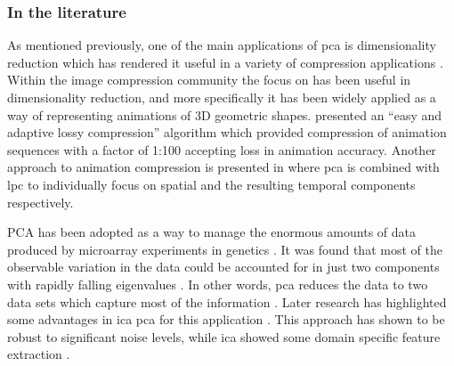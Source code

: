 \subsubsection{In the literature}
As mentioned previously, one of the main applications of \DIFdelbegin {}\DIFdelend \DIFaddbegin \gls{pca} \DIFaddend is dimensionality reduction which has rendered it useful in a variety of compression applications \citep{Vasilescu2003}\cite{Alexa2000}\linebreak[2]\cite{Zaeri2006}. Within the image compression community \citep{Vasilescu2003} the focus on \DIFdelbegin {}\DIFdelend \DIFaddbegin {}\DIFaddend has been useful in dimensionality reduction, and more specifically it has been widely applied as a way of representing animations of 3D geometric shapes. \cite{Alexa2000} presented an ``easy and adaptive lossy compression'' algorithm which provided compression of animation sequences with a factor of 1:100 accepting loss in animation accuracy. Another approach to animation compression is presented in \cite{Karni2004} where \DIFdelbegin {}\DIFdelend \DIFaddbegin \gls{pca} \DIFaddend is combined with \DIFdelbegin {}\DIFdelend \DIFaddbegin \gls{lpc} \DIFaddend to individually focus on spatial and the resulting temporal components respectively.

PCA has been adopted as a way to manage the enormous amounts of data produced by microarray experiments in genetics \cite{Raychaudhuri2000}\cite{Saidi2004}. It was found that most of the observable variation in the data could be accounted for in just two components with \DIFdelbegin {}\DIFdelend rapidly falling eigenvalues \cite{Raychaudhuri2000}. In other words, \DIFdelbegin {}\DIFdelend \DIFaddbegin \gls{pca} \DIFaddend reduces the data to two data sets which capture most of the information \cite{Raychaudhuri2000}. Later research has highlighted some advantages in \DIFdelbegin {}\DIFdelend \DIFaddbegin \gls{ica} \gls{pca} \DIFaddend for this application \cite{Saidi2004}. This approach has shown to be robust to significant noise levels, while \DIFdelbegin {}\DIFdelend \DIFaddbegin \gls{ica} \DIFaddend showed some domain specific feature extraction \DIFdelbegin {}\DIFdelend \DIFaddbegin {}\DIFaddend .

